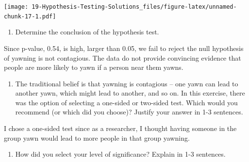 \documentclass[
]{book}
\newenvironment{Shaded}{\begin{snugshade}}{\end{snugshade}}
\newcommand{\DataTypeTok}[1]{\textcolor[rgb]{0.13,0.29,0.53}{#1}}
\newcommand{\KeywordTok}[1]{\textcolor[rgb]{0.13,0.29,0.53}{\textbf{#1}}}
\newcommand{\NormalTok}[1]{#1}
\newcommand{\OperatorTok}[1]{\textcolor[rgb]{0.81,0.36,0.00}{\textbf{#1}}}
\newcommand{\StringTok}[1]{\textcolor[rgb]{0.31,0.60,0.02}{#1}}
\providecommand{\tightlist}{%
  \setlength{\itemsep}{0pt}\setlength{\parskip}{0pt}}
\begin{document}
\begin{Shaded}
\end{Shaded}

\texttt{[image: 19-Hypothesis-Testing-Solutions\_files/figure-latex/unnamed-chunk-17-1.pdf]}

\begin{enumerate}
\def\labelenumi{\alph{enumi}.}
\setcounter{enumi}{4}
\tightlist
\item
  Determine the conclusion of the hypothesis test.
\end{enumerate}

Since p-value, 0.54, is high, larger than 0.05, we fail to reject the null hypothesis of yawning is not contagious. The data do not provide convincing evidence that people are more likely to yawn if a person near them yawns.

\begin{enumerate}
\def\labelenumi{\alph{enumi}.}
\setcounter{enumi}{5}
\tightlist
\item
  The traditional belief is that yawning is contagious -- one yawn can lead to another yawn, which might lead to another, and so on. In this exercise, there was the option of selecting a one-sided or two-sided test. Which would you recommend (or which did you choose)? Justify your answer in 1-3 sentences.
\end{enumerate}

I chose a one-sided test since as a researcher, I thought having someone in the group yawn would lead to more people in that group yawning.

\begin{enumerate}
\def\labelenumi{\alph{enumi}.}
\setcounter{enumi}{6}
\tightlist
\item
  How did you select your level of significance? Explain in 1-3 sentences.
\end{enumerate}
\end{document}
